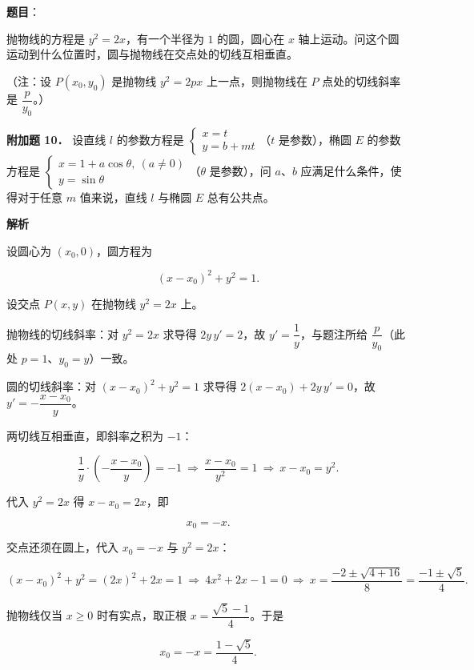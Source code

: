 \begin{answer}

\textbf{题目}：

抛物线的方程是 $y^2=2x$，有一个半径为 $1$ 的圆，圆心在 $x$ 轴上运动。问这个圆运动到什么位置时，圆与抛物线在交点处的切线互相垂直。

（注：设 $P(x_0,y_0)$ 是抛物线 $y^2=2px$ 上一点，则抛物线在 $P$ 点处的切线斜率是 $\dfrac{p}{y_0}$。）

\textbf{附加题 10．} 设直线 $l$ 的参数方程是 $\begin{cases}x=t\\ y=b+mt\end{cases}$（$t$ 是参数），椭圆 $E$ 的参数方程是 $\begin{cases}x=1+a\cos\theta,\ (a\neq0)\\ y=\sin\theta\end{cases}$（$\theta$ 是参数），问 $a$、$b$ 应满足什么条件，使得对于任意 $m$ 值来说，直线 $l$ 与椭圆 $E$ 总有公共点。

\textbf{解析}

设圆心为 $(x_0,0)$，圆方程为

\nopagebreak[4]
\[
(x-x_0)^2+y^2=1.
\]

设交点 $P(x,y)$ 在抛物线 $y^2=2x$ 上。

抛物线的切线斜率：对 $y^2=2x$ 求导得 $2y\,y'=2$，故 $y'=\dfrac1y$，与题注所给 $\dfrac{p}{y_0}$（此处 $p=1$、$y_0=y$）一致。

圆的切线斜率：对 $(x-x_0)^2+y^2=1$ 求导得 $2(x-x_0)+2y\,y'=0$，故 $y'=-\dfrac{x-x_0}{y}$。

两切线互相垂直，即斜率之积为 $-1$：

\nopagebreak[4]
\[
\frac1y\cdot\left(-\frac{x-x_0}{y}\right)=-1
\ \Longrightarrow\ \frac{x-x_0}{y^2}=1
\ \Longrightarrow\ x-x_0=y^2.
\]

代入 $y^2=2x$ 得 $x-x_0=2x$，即

\nopagebreak[4]
\[
x_0=-x.
\]

交点还须在圆上，代入 $x_0=-x$ 与 $y^2=2x$：

\nopagebreak[4]
\[
(x-x_0)^2+y^2=(2x)^2+2x=1
\ \Longrightarrow\ 4x^2+2x-1=0
\ \Longrightarrow\ x=\frac{-2\pm\sqrt{4+16}}{8}=\frac{-1\pm\sqrt5}{4}.
\]

抛物线仅当 $x\geqslant0$ 时有实点，取正根 $x=\dfrac{\sqrt5-1}{4}$。于是

\nopagebreak[4]
\[
x_0=-x=\frac{1-\sqrt5}{4}.
\]


\end{answer}
